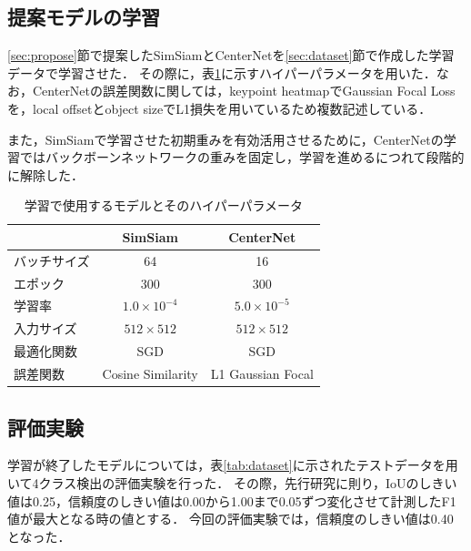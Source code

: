 \documentclass[a4j,8pt,twocolumn]{extarticle}
\begin{document}
        \subsection{提案モデルの学習}
            \label{sec:train}
            \ref{sec:propose}節で提案したSimSiamとCenterNetを\ref{sec:dataset}節で作成した学習データで学習させた．
            その際に，表\ref{tab:param}に示すハイパーパラメータを用いた．なお，CenterNetの誤差関数に関しては，keypoint heatmapでGaussian Focal Lossを，local offsetとobject sizeでL1損失を用いているため複数記述している．

            また，SimSiamで学習させた初期重みを有効活用させるために，CenterNetの学習ではバックボーンネットワークの重みを固定し，学習を進めるにつれて段階的に解除した．

            \begin{table}[!t]
                \centering
                \caption{学習で使用するモデルとそのハイパーパラメータ}
                \label{tab:param}
                    \begin{tabular}{l|cc} \hline
                        & SimSiam & CenterNet \\ \hline
                        バッチサイズ &  64 &  16 \\
                        エポック &  300 &  300 \\
                        学習率 & $1.0 \times 10^{-4}$ & $5.0 \times 10^{-5}$ \\
                        入力サイズ & $512 \times 512$ & $512 \times 512$ \\
                        最適化関数 & SGD & SGD \\
                        誤差関数 & Cosine Similarity & L1 Gaussian Focal \\ \hline
                    \end{tabular}
            \end{table}

            \subsection{評価実験}
                \label{sec:eval}
                学習が終了したモデルについては，表\ref{tab:dataset}に示されたテストデータを用いて4クラス検出の評価実験を行った．
                その際，先行研究に則り，IoUのしきい値は0.25，信頼度のしきい値は0.00から1.00まで0.05ずつ変化させて計測したF1値が最大となる時の値とする．
                今回の評価実験では，信頼度のしきい値は0.40となった．
\end{document}
